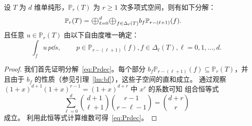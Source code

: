 \begin{theorem}\label{thm:Lagrangedec}
设 $T$ 为 $d$ 维单纯形，$\mathbb{P}_r(T)$ 为 $r\ge 1$ 次多项式空间，则有如下分解：
\begin{align}
\label{eq:Prdec}
\mathbb P_r(T) &= \Oplus_{\ell = 0}^d\Oplus_{f\in \Delta_{\ell}(T)} b_f\mathbb P_{r - (\ell +1)} (f).
\end{align}
且任意 $u \in \mathbb{P}_r(T)$ 由以下自由度唯一确定：
\begin{equation}\label{eq:dofPr}
\int_f u \, p \dd s, \quad \quad~p\in \mathbb P_{r - (\ell +1)} (f), f\in \Delta_{\ell}(T), \ell = 0,1,\ldots, d.
\end{equation}
\end{theorem}
\begin{proof}
我们首先证明分解~\eqref{eq:Prdec}。每个部分 $b_f \mathbb{P}_{r-(\ell+1)}(f) \subseteq \mathbb{P}_r(T)$，并且由于 $b_f$ 的性质（参见引理~\ref{lm:bf}），这些子空间的直和成立。
通过观察 $(1+x)^{d+1} (1+x)^{r-1} = (1+x)^{d+r}$ 中 $x^r$ 的系数可知
组合恒等式
$$
\sum_{\ell =0}^d { d+1 \choose \ell + 1} { r - 1 \choose r - \ell - 1} = { d + r \choose r}
$$
成立。
利用此恒等式计算维数可得~\eqref{eq:Prdec}。


\end{proof}
